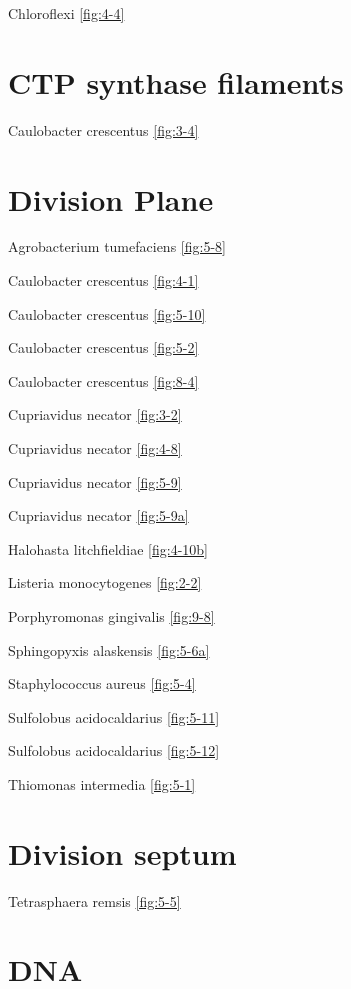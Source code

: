 \documentclass[]{tufte-book}
\begin{document}
Chloroflexi \ref{fig:4-4}

\hypertarget{ctp-synthase-filaments}{%
\section*{CTP synthase filaments}\label{ctp-synthase-filaments}}

Caulobacter crescentus \ref{fig:3-4}

\hypertarget{division-plane}{%
\section*{Division Plane}\label{division-plane}}

Agrobacterium tumefaciens \ref{fig:5-8}

Caulobacter crescentus \ref{fig:4-1}

Caulobacter crescentus \ref{fig:5-10}

Caulobacter crescentus \ref{fig:5-2}

Caulobacter crescentus \ref{fig:8-4}

Cupriavidus necator \ref{fig:3-2}

Cupriavidus necator \ref{fig:4-8}

Cupriavidus necator \ref{fig:5-9}

Cupriavidus necator \ref{fig:5-9a}

Halohasta litchfieldiae \ref{fig:4-10b}

Listeria monocytogenes \ref{fig:2-2}

Porphyromonas gingivalis \ref{fig:9-8}

Sphingopyxis alaskensis \ref{fig:5-6a}

Staphylococcus aureus \ref{fig:5-4}

Sulfolobus acidocaldarius \ref{fig:5-11}

Sulfolobus acidocaldarius \ref{fig:5-12}

Thiomonas intermedia \ref{fig:5-1}

\hypertarget{division-septum}{%
\section*{Division septum}\label{division-septum}}

Tetrasphaera remsis \ref{fig:5-5}

\hypertarget{dna-1}{%
\section*{DNA}\label{dna-1}}
\end{document}

